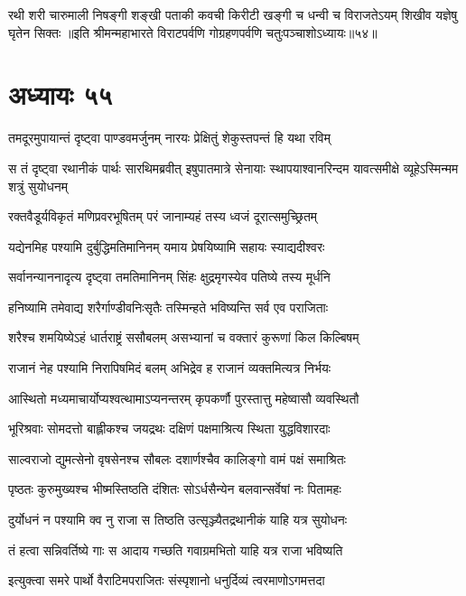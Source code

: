 \fourlineindentedshloka
{रथी शरी चारुमाली निषङ्गी}
{शङ्खी पताकी कवची किरीटी}
{खङ्गी च धन्वी च विराजतेऽयम्}
{शिखीव यज्ञेषु घृतेन सिक्तः}
॥इति श्रीमन्महाभारते विराटपर्वणि गोग्रहणपर्वणि चतुःपञ्चाशोऽध्यायः॥५४॥

\chapter{अध्यायः ५५}

\twolineshloka
{तमदूरमुपायान्तं दृष्ट्वा पाण्डवमर्जुनम्}
{नारयः प्रेक्षितुं शेकुस्तपन्तं हि यथा रविम्}


\threelineshloka
{स तं दृष्ट्वा रथानीकं पार्थः सारथिमब्रवीत्}
{इषुपातमात्रे सेनायाः स्थापयाश्वानरिन्दम}
{यावत्समीक्षे व्यूहेऽस्मिन्मम शत्रुं सुयोधनम्}


\twolineshloka
{रक्तवैडूर्यविकृतं मणिप्रवरभूषितम्}
{परं जानाम्यहं तस्य ध्वजं दूरात्समुच्छ्रितम्}


\twolineshloka
{यद्येनमिह पश्यामि दुर्बुद्धिमतिमानिनम्}
{यमाय प्रेषयिष्यामि सहायः स्याद्यदीश्वरः}


\twolineshloka
{सर्वानन्याननादृत्य दृष्ट्वा तमतिमानिनम्}
{सिंहः क्षुद्रमृगस्येव पतिष्ये तस्य मूर्धनि}


\twolineshloka
{हनिष्यामि तमेवाद्य शरैर्गाण्डीवनिःसृतैः}
{तस्मिन्हते भविष्यन्ति सर्व एव पराजिताः}


\twolineshloka
{शरैश्च शमयिष्येऽहं धार्तराष्ट्रं ससौबलम्}
{असभ्यानां च वक्तारं कुरूणां किल किल्बिषम्}


\twolineshloka
{राजानं नेह पश्यामि निरापिषमिदं बलम्}
{अभिद्रेव ह राजानं व्यक्तमित्यत्र निर्भयः}


\twolineshloka
{आस्थितो मध्यमाचार्योप्यश्वत्थामाऽप्यनन्तरम्}
{कृपकर्णौ पुरस्तात्तु महेष्वासौ व्यवस्थितौ}


\twolineshloka
{भूरिश्रवाः सोमदत्तो बाह्लीकश्च जयद्रथः}
{दक्षिणं पक्षमाश्रित्य स्थिता युद्धविशारदाः}


\twolineshloka
{साल्वराजो द्युमत्सेनो वृषसेनश्च सौबलः}
{दशार्णश्चैव कालिङ्गो वामं पक्षं समाश्रितः}


\twolineshloka
{पृष्ठतः कुरुमुख्यश्च भीष्मस्तिष्ठति दंशितः}
{सोऽर्धसैन्येन बलवान्सर्वेषां नः पितामहः}


\twolineshloka
{दुर्योधनं न पश्यामि क्व नु राजा स तिष्ठति}
{उत्सृञ्ज्यैतद्रथानीकं याहि यत्र सुयोधनः}


\twolineshloka
{तं हत्वा सन्निवर्तिष्ये गाः स आदाय गच्छति}
{गवाग्रमभितो याहि यत्र राजा भविष्यति}



\twolineshloka
{इत्युक्त्वा समरे पार्थो वैराटिमपराजितः}
{संस्पृशानो धनुर्दिव्यं त्वरमाणोऽगमत्तदा}


